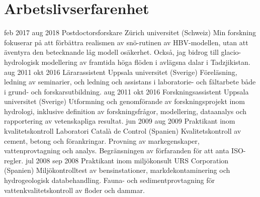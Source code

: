 \ifswedish
    \section{Arbetslivserfarenhet}
        \position
            {feb 2017 \textemdash{} aug 2018}
            {Postdoctorsforskare}
            {Zürich universitet (Schweiz)}
            {Min forskning fokuserar på att förbättra realismen av snö-rutinen av HBV-modellen, utan att äventyra den betecknande låg modell osäkerhet. Också, jag bidrog till glacio-hydrologisk modellering av framtida höga flöden i avlägsna dalar i Tadzjikistan.}
        \position
            {aug 2011 \textemdash{} okt 2016}
            {Lärarassistent}
            {Uppsala universitet (Sverige)}
            {Föreläsning, ledning av seminarier, och ledning och assistans i laboratorie- och fältarbete både i grund- och forskarsutbildning.}
        \position
            {aug 2011 \textemdash{} okt 2016}
            {Forskningsassistent}
            {Uppsala universitet (Sverige)}
            {Utformning och genomförande av forskningsprojekt inom hydrologi, inklusive definition av forskningsfrågor, modellering, dataanalys och rapportering av vetenskapliga resultat.}
        \position
            {jun 2009 \textemdash{} aug 2009}
            {Praktikant inom kvalitetskontroll}
            {Laboratori Català de Control (Spanien)}
            {Kvalitetskontroll av cement, betong och förankringar. Provning av markegenskaper, vattenprovtagning och analys. Begränsningen av förfaranden för att anta ISO-regler.}
        \position
            {jul 2008 \textemdash{} sep 2008}
            {Praktikant inom miljökonsult}
            {URS Corporation (Spanien)}
            {Miljökontrolltest av bensinstationer, markdekontaminering och hydrogeologisk databehandling. Fauna- och sedimentprovtagning för vattenkvalitetskontroll av floder och dammar.}
\else
